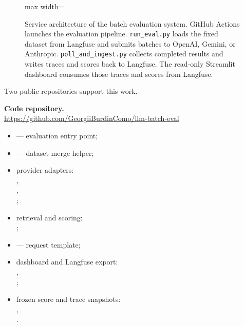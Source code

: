 \begin{figure}[htbp]
    \centering
    \begin{adjustbox}{max width=\linewidth}
    
    \end{adjustbox}
    \caption[Batch evaluation system architecture]{Service architecture of the batch evaluation system. GitHub Actions launches the evaluation pipeline. \texttt{run\_eval.py} loads the fixed dataset from Langfuse and submits batches to OpenAI, Gemini, or Anthropic. \texttt{poll\_and\_ingest.py} collects completed results and writes traces and scores back to Langfuse. The read-only Streamlit dashboard consumes those traces and scores from Langfuse.}
    \label{fig:system-architecture}
\end{figure}

Two public repositories support this work.

\noindent\textbf{Code repository.}\\
\url{https://github.com/GeorgiiBurdinComo/llm-batch-eval}
\begin{itemize}
    \item \mbox{}
    --- evaluation entry point;
    \item \mbox{}
    --- dataset merge helper;
    \item provider adapters:\\
    \mbox{},\\
    \mbox{},\\
    \mbox{};
    \item retrieval and scoring:\\
    \mbox{};
    \item \mbox{}
    --- request template;
    \item dashboard and Langfuse export:\\
    \mbox{},\\
    \mbox{};
    \item frozen score and trace snapshots:\\
    \mbox{},\\
    \mbox{}.
\end{itemize}

